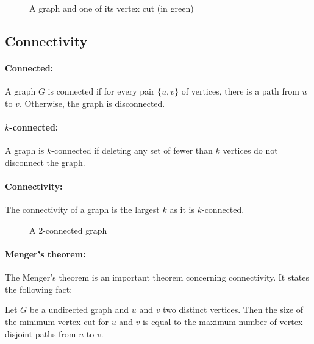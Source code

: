 \begin{figure}[!h]
  \begin{center}
    
  \end{center}
  \caption{A graph and one of its vertex cut (in green)}
\end{figure}

\subsection{Connectivity}
\paragraph{Connected:}\label{defConnectivity}
A graph $G$ is connected if for every pair $\{u,v\}$ of vertices, there is a 
path from $u$ to $v$. Otherwise, the graph is disconnected.

\paragraph{$k$-connected:}
A graph is $k$-connected if deleting any set of fewer than $k$ vertices do not 
disconnect the graph.

\paragraph{Connectivity:}
The connectivity of a graph is the largest $k$ as it is $k$-connected. 

\begin{figure}[!h]
  \begin{center}
    
  \end{center}
  \caption{A 2-connected graph}
\end{figure}

\paragraph{Menger's theorem:}
The Menger's theorem is an important theorem concerning connectivity.
It states the following fact:

Let $G$ be a undirected graph and $u$ and $v$ two distinct vertices.
Then the size of the minimum vertex-cut for $u$ and $v$ is equal to the
maximum number of vertex-disjoint paths from $u$ to $v$.



